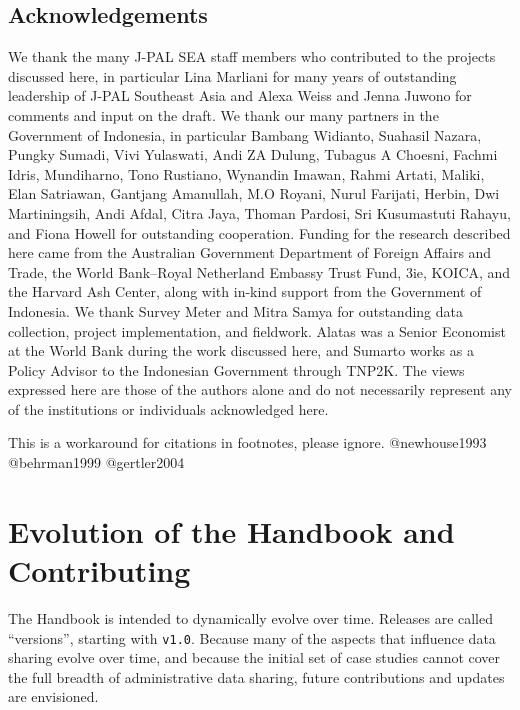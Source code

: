 \documentclass[
]{book}
\begin{document}
\hypertarget{acknowledgements-4}{%
\section*{Acknowledgements}\label{acknowledgements-4}}

We thank the many J-PAL SEA staff members who contributed to the projects discussed here, in particular Lina Marliani for many years of outstanding leadership of J-PAL Southeast Asia and Alexa Weiss and Jenna Juwono for comments and input on the draft. We thank our many partners in the Government of Indonesia, in particular Bambang Widianto, Suahasil Nazara, Pungky Sumadi, Vivi Yulaswati, Andi ZA Dulung, Tubagus A Choesni, Fachmi Idris, Mundiharno, Tono Rustiano, Wynandin Imawan, Rahmi Artati, Maliki, Elan Satriawan, Gantjang Amanullah, M.O Royani, Nurul Farijati, Herbin, Dwi Martiningsih, Andi Afdal, Citra Jaya, Thoman Pardosi, Sri Kusumastuti Rahayu, and Fiona Howell for outstanding cooperation. Funding for the research described here came from the Australian Government Department of Foreign Affairs and Trade, the World Bank--Royal Netherland Embassy Trust Fund, 3ie, KOICA, and the Harvard Ash Center, along with in-kind support from the Government of Indonesia. We thank Survey Meter and Mitra Samya for outstanding data collection, project implementation, and fieldwork. Alatas was a Senior Economist at the World Bank during the work discussed here, and Sumarto works as a Policy Advisor to the Indonesian Government through TNP2K. The views expressed here are those of the authors alone and do not necessarily represent any of the institutions or individuals acknowledged here.

\begin{invisible}
This is a workaround for citations in footnotes, please ignore.
@newhouse1993 @behrman1999 @gertler2004
\end{invisible}

\hypertarget{appendix-appendix}{%
\appendix}


\hypertarget{contributing}{%
\chapter*{Evolution of the Handbook and Contributing}\label{contributing}}

The Handbook is intended to dynamically evolve over time. Releases are called ``versions'', starting with \texttt{v1.0}. Because many of the aspects that influence data sharing evolve over time, and because the initial set of case studies cannot cover the full breadth of administrative data sharing, future contributions and updates are envisioned.
\end{document}
